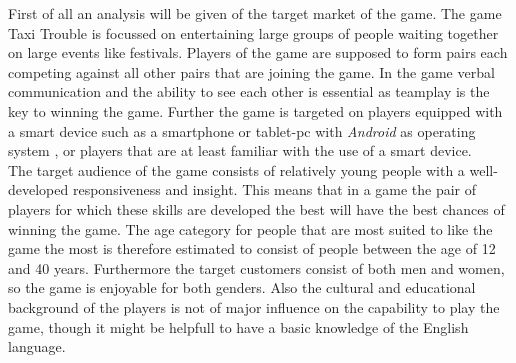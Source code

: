 First of all an analysis will be given of the target market of the game. The game Taxi Trouble is focussed on entertaining large groups of people waiting together on large events like festivals. Players of the game are supposed to form pairs each competing against all other pairs that are joining the game. In the game verbal communication and the ability to see each other is essential as teamplay is the key to winning the game. Further the game is targeted on players equipped with a smart device such as a smartphone or tablet-pc with \textit{Android} as operating system , or players that are at least familiar with the use of a smart device.\\
The target audience of the game consists of relatively young people with a well-developed responsiveness and insight. This means that in a game the pair of players for which these skills are developed the best will have the best chances of winning the game. The age category for people that are most suited to like the game the most is therefore estimated to consist of people between the age of 12 and 40 years. Furthermore the target customers consist of both men and women, so the game is enjoyable for both genders. Also the cultural and educational background of the players is not of major influence on the capability to play the game, though it might be helpfull to have a basic knowledge of the English language.
     